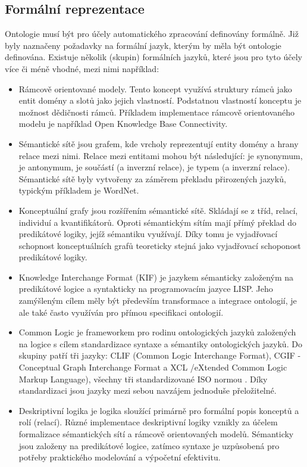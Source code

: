 \documentclass[11pt,twoside,a4paper]{book}
\begin{document}
		\subsection{Formální reprezentace}
		Ontologie musí být pro účely automatického zpracování definovány formálně. Již byly naznačeny požadavky na formální jazyk, kterým by měla být ontologie definována. Existuje několik (skupin) formálních jazyků, které jsou pro tyto účely více či méně vhodné, mezi nimi například:\cite{ontologieh08}
\begin{itemize}
\item{Rámcově orientované modely. Tento koncept využívá struktury rámců jako entit domény a slotů jako jejich vlastností. Podstatnou vlastností konceptu je možnost dědičnosti rámců. Příkladem implementace rámcově orientovaného modelu je například Open Knowledge Base Connectivity.\cite{okbc01}}
\item{Sémantické sítě jsou grafem, kde vrcholy reprezentují entity domény a hrany relace mezi nimi. Relace mezi entitami mohou být následující: je synonymum, je antonymum, je součástí (a inverzní relace), je typem (a inverzní relace). Sémantické sítě byly vytvořeny za záměrem překladu přirozených jazyků, typickým příkladem je WordNet.\cite{wordnet01} }
\item{Konceptuální grafy jsou rozšířením sémantické sítě. Skládají se z tříd, relací, individuí a kvantifikátorů. Oproti sémantickým sítím mají přímý překlad do predikátové logiky, jejíž sémantiku využívají. Díky tomu je vyjadřovací schopnost konceptuálních grafů teoreticky stejná jako vyjadřovací schoponost predikátové logiky.\cite{semgraf01}}
\item{Knowledge Interchange Format (KIF) je jazykem sémanticky založeným na predikátové logice a syntakticky na programovacím jazyce LISP\cite{lisp01}. Jeho zamýšleným cílem měly být především transformace a integrace ontologií, je ale také často využíván pro přímou specifikaci ontologií.\cite{ontologiei09}} 
\item{Common Logic je frameworkem pro rodinu ontologických jazyků založených na logice s cílem standardizace syntaxe a sémantiky ontologických jazyků. Do skupiny patří tři jazyky: CLIF (Common Logic Interchange Format), CGIF - Conceptual Graph Interchange Format a XCL /eXtended Common Logic Markup Language), všechny tři standardizované ISO normou \cite{comlog01}. Díky standardizaci jsou jazyky mezi sebou navzájem jednoduše přeložitelné.}
\item{Deskriptivní logika je logika sloužící primárně pro formální popis konceptů a rolí (relací). Různé implementace deskriptivní logiky vznikly za účelem formalizace sémantických sítí a rámcově orientovaných modelů. Sémanticky jsou založeny na predikátové logice, zatímco syntaxe je uzpůsobená pro potřeby praktického modelování a výpočetní efektivitu.\cite{deslog01}}
\end{itemize}
\end{document}
